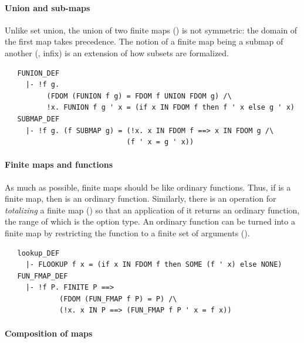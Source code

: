 {\paragraph {Union and sub-maps}

Unlike set union, the union of two finite maps
() is not symmetric: the domain of the first map
takes precedence. The notion of a finite map being a submap of another
(, infix) is an extension of how subsets are
formalized.
\begin{hol}
\begin{verbatim}
   FUNION_DEF
     |- !f g.
          (FDOM (FUNION f g) = FDOM f UNION FDOM g) /\
          !x. FUNION f g ' x = (if x IN FDOM f then f ' x else g ' x)
   SUBMAP_DEF
     |- !f g. (f SUBMAP g) = (!x. x IN FDOM f ==> x IN FDOM g /\
                             (f ' x = g ' x))
\end{verbatim}
\end{hol}

\paragraph {Finite maps and functions}

As much as possible, finite maps should be like ordinary functions.
Thus, if  is a finite map, then  is an
ordinary function. Similarly, there is an operation for
\emph{totalizing} a finite map (\holtxt{lookup}) so that an
application of it returns an ordinary function, the range of which is
the option type.  An ordinary function can be turned into a finite map
by restricting the function to a finite set of arguments
(\ml{FUN\_FMAP\_DEF}).
%
\begin{hol}
\begin{verbatim}
   lookup_DEF
     |- FLOOKUP f x = (if x IN FDOM f then SOME (f ' x) else NONE)
   FUN_FMAP_DEF
     |- !f P. FINITE P ==>
             (FDOM (FUN_FMAP f P) = P) /\
             (!x. x IN P ==> (FUN_FMAP f P ' x = f x))
\end{verbatim}
\end{hol}

\paragraph {Composition of maps}

}
